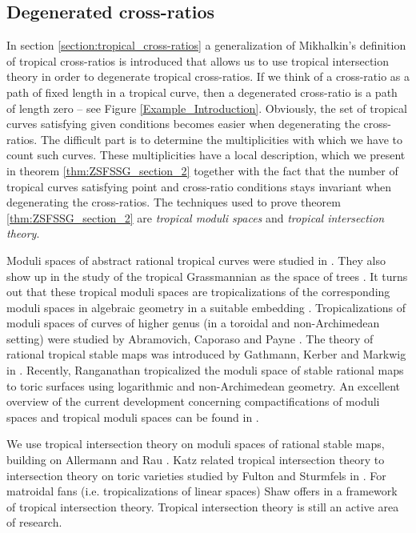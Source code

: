 \documentclass[11pt,reqno,a4]{amsart}
\theoremstyle{dotless}
\theoremstyle{definition}
\begin{document}
\subsection*{Degenerated cross-ratios}
In section \ref{section:tropical_cross-ratios} a generalization of Mikhalkin's definition of tropical cross-ratios is introduced that allows us to use tropical intersection theory in order to degenerate tropical cross-ratios. If we think of a cross-ratio as a path of fixed length in a tropical curve, then a degenerated cross-ratio is a path of length zero -- see Figure \ref{Example_Introduction}. Obviously, the set of tropical curves satisfying given conditions becomes easier when degenerating the cross-ratios. The difficult part is to determine the multiplicities with which we have to count such curves. These multiplicities have a local description, which we present in theorem \ref{thm:ZSFSSG_section_2} together with the fact that the number of tropical curves satisfying point and cross-ratio conditions stays invariant when degenerating the cross-ratios. The techniques used to prove theorem \ref{thm:ZSFSSG_section_2} are \textit{tropical moduli spaces} and \textit{tropical intersection theory}. 

Moduli spaces of abstract rational tropical curves were studied in \cite{MikhalkinCRC}. They also show up in the study of the tropical Grassmannian as the space of trees \cite{TropicalGrassmannian, AK}.  
It turns out that these tropical moduli spaces are tropicalizations of the corresponding moduli spaces in algebraic geometry in a suitable embedding \cite{GM, Tev}. Tropicalizations of moduli spaces of curves of higher genus (in a toroidal and non-Archimedean setting) were studied by Abramovich, Caporaso and Payne \cite{AbramovichCaporasoPayne}. The theory of rational tropical stable maps was introduced by Gathmann, Kerber and Markwig in \cite{GathmannKerberMarkwig}. Recently, Ranganathan \cite{DhruvStableMapsOne} tropicalized the moduli space of stable rational maps to toric surfaces using logarithmic and non-Archimedean geometry. An excellent overview of the current development concerning compactifications of moduli spaces and tropical moduli spaces can be found in \cite{ICM2018}.

We use tropical intersection theory on moduli spaces of rational stable maps, building on Allermann and Rau \cite{FirstStepsIntersectionTheory, JohannesIntersectionsonTropModuliSpaces}. Katz \cite{Katz2012} related tropical intersection theory to intersection theory on toric varieties studied by Fulton and Sturmfels in \cite{FultonSturmfels}. For matroidal fans (i.e. tropicalizations of linear spaces) Shaw offers in \cite{IntersectionMatroidalFans} a framework of tropical intersection theory. Tropical intersection theory is still an active area of research.
\end{document}
